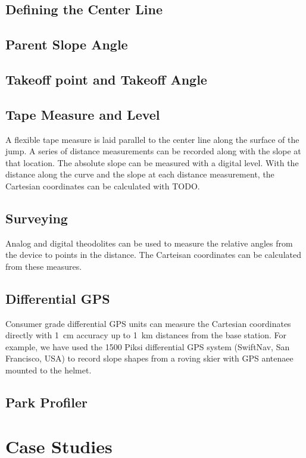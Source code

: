 \documentclass{article}
\begin{document}
\subsection{Defining the Center Line}
%

\subsection{Parent Slope Angle}
%

\subsection{Takeoff point and Takeoff Angle}
%

\subsection{Tape Measure and Level}
%
A flexible tape measure is laid parallel to the center line along the surface
of the jump. A series of distance measurements can be recorded along with the
slope at that location. The absolute slope can be measured with a digital
level. With the distance along the curve and the slope at each distance
measurement, the Cartesian coordinates can be calculated with TODO.

\subsection{Surveying}
%
Analog and digital theodolites can be used to measure the relative angles from
the device to points in the distance. The Carteisan coordinates can be
calculated from these measures.

\subsection{Differential GPS}
%
Consumer grade differential GPS units can measure the Cartesian coordinates
directly with 1~\si{\centi\meter} accuracy up to 1~\si{\kilo\meter}
distances from the base station. For example, we have used the 1500 Piksi
differential GPS system (SwiftNav, San Francisco, USA) to record slope shapes
from a roving skier with GPS antenaee mounted to the helmet.

\subsection{Park Profiler}

\section{Case Studies}
\end{document}
